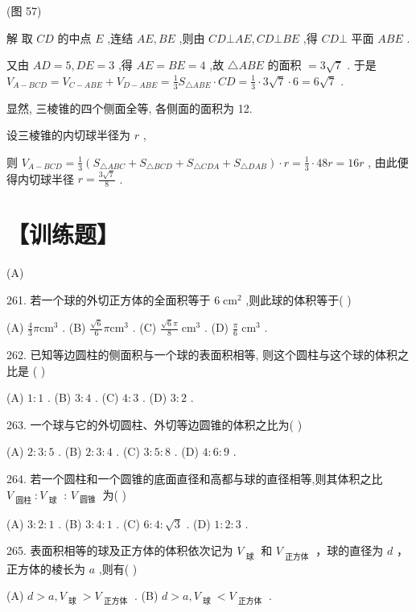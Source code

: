 \documentclass[10pt]{article}
\begin{document}
(图 57)

解 取 \({CD}\) 的中点 \(E\) ,连结 \({AE},{BE}\) ,则由 \({CD} \bot  {AE},{CD} \bot  {BE}\) ,得 \({CD} \bot\) 平面 \({ABE}\) .

又由 \({AD} = 5,{DE} = 3\) ,得 \({AE} = {BE} = 4\) ,故 \(\bigtriangleup {ABE}\) 的面积 \(= 3\sqrt{7}\) . 于是 \({V}_{A - {BCD}} = {V}_{C - {ABE}} + {V}_{D - {ABE}} = \frac{1}{3}{S}_{\bigtriangleup {ABE}} \cdot  {CD} = \frac{1}{3} \cdot  3\sqrt{7} \cdot  6 = 6\sqrt{7}\) .

显然, 三棱锥的四个侧面全等, 各侧面的面积为 12.

设三棱锥的内切球半径为 \(r\) ,

则 \({V}_{A - {BCD}} = \frac{1}{3}\left( {{S}_{\bigtriangleup {ABC}} + {S}_{\bigtriangleup {BCD}} + {S}_{\bigtriangleup {CDA}} + {S}_{\bigtriangleup {DAB}}}\right)  \cdot  r = \frac{1}{3} \cdot  {48r} = {16r}\) , 由此便得内切球半径 \(r = \frac{3\sqrt{7}}{8}\) .

\section*{【训练题】}

(A)

261. 若一个球的外切正方体的全面积等于 \(6{\mathrm{\;{cm}}}^{2}\) ,则此球的体积等于( )

(A) \(\frac{4}{3}\pi {\mathrm{{cm}}}^{3}\) . (B) \(\frac{\sqrt{6}}{6}\pi {\mathrm{{cm}}}^{3}\) . (C) \(\frac{\sqrt{6}\pi }{8}{\mathrm{\;{cm}}}^{3}\) . (D) \(\frac{\pi }{6}{\mathrm{\;{cm}}}^{3}\) .

262. 已知等边圆柱的侧面积与一个球的表面积相等, 则这个圆柱与这个球的体积之比是 ( )

(A) \(1 : 1\) . (B) \(3 : 4\) . (C) \(4 : 3\) . (D) \(3 : 2\) .

263. 一个球与它的外切圆柱、外切等边圆锥的体积之比为( )

(A) \(2 : 3 : 5\) . (B) \(2 : 3 : 4\) . (C) \(3 : 5 : 8\) . (D) \(4 : 6 : 9\) .

264. 若一个圆柱和一个圆锥的底面直径和高都与球的直径相等,则其体积之比 \({V}_{\text{ 圆柱 }} : {V}_{\text{ 球 }}\) : \({V}_{\text{ 圆锥 }}\) 为( )

(A) \(3 : 2 : 1\) . (B) \(3 : 4 : 1\) . (C) \(6 : 4 : \sqrt{3}\) . (D) \(1 : 2 : 3\) .

265. 表面积相等的球及正方体的体积依次记为 \({V}_{\text{ 球 }}\) 和 \({V}_{\text{ 正方体 }}\) ，球的直径为 \(d\) ，正方体的棱长为 \(a\) ,则有(   )

(A) \(d > a,{V}_{\text{ 球 }} > {V}_{\text{ 正方体 }}\) . (B) \(d > a,{V}_{\text{ 球 }} < {V}_{\text{ 正方体 }}\) .
\end{document}
